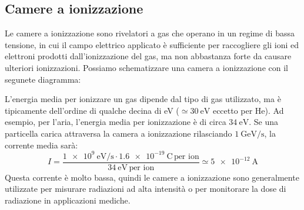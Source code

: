 \subsection{Camere a ionizzazione}
Le camere a ionizzazione sono rivelatori a gas che operano in un regime di bassa tensione, in cui il campo elettrico applicato è sufficiente per raccogliere gli ioni ed elettroni prodotti dall'ionizzazione del gas, ma non abbastanza forte da causare ulteriori ionizzazioni. Possiamo schematizzare una camera a ionizzazione con il segunete diagramma:


L'energia media per ionizzare un gas dipende dal tipo di gas utilizzato, ma è tipicamente dell'ordine di qualche decina di eV ($\simeq \qty{30}{\electronvolt}$ eccetto per He). Ad esempio, per l'aria, l'energia media per ionizzazione è di circa $\qty{34}{\electronvolt}$. Se una particella carica attraversa la camera a ionizzazione rilasciando $\qty{1}{\giga\electronvolt\per\second}$, la corrente media sarà:
\begin{equation}
    I = \dfrac{\qty{1e9}{\electronvolt\per\second} \cdot \qty{1.6e-19}{\coulomb}\,\text{per ion}}{\qty{34}{\electronvolt}\,\text{per ion}} \simeq \qty{5e-12}{\ampere}
\end{equation}
Questa corrente è molto bassa, quindi le camere a ionizzazione sono generalmente utilizzate per misurare radiazioni ad alta intensità o per monitorare la dose di radiazione in applicazioni mediche.
